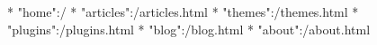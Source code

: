 * "home":/
* "articles":/articles.html
* "themes":/themes.html
* "plugins":/plugins.html
* "blog":/blog.html
* "about":/about.html
